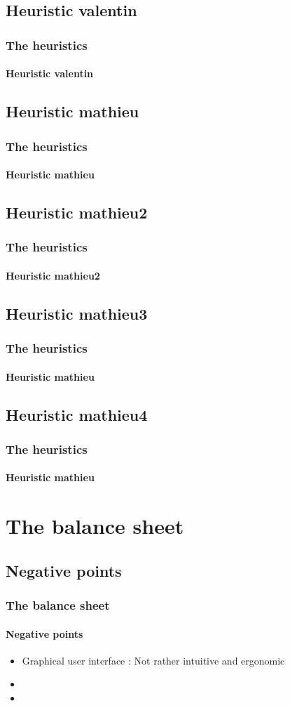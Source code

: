 \documentclass[a4paper, 11pt]{beamer}
\begin{document}
\subsection{Heuristic valentin}
\begin{frame}
 \frametitle{The heuristics}
 \framesubtitle{Heuristic valentin}
 
\end{frame}

\subsection{Heuristic mathieu}
\begin{frame}
 \frametitle{The heuristics}
 \framesubtitle{Heuristic mathieu}
 
\end{frame}

\subsection{Heuristic mathieu2}
\begin{frame}
 \frametitle{The heuristics}
 \framesubtitle{Heuristic mathieu2}
 
\end{frame}

\subsection{Heuristic mathieu3}
\begin{frame}
 \frametitle{The heuristics}
 \framesubtitle{Heuristic mathieu}
 
\end{frame}

\subsection{Heuristic mathieu4}
\begin{frame}
 \frametitle{The heuristics}
 \framesubtitle{Heuristic mathieu}
 
\end{frame}

\section{The balance sheet}
\subsection{Negative points}
\begin{frame}
 \frametitle{The balance sheet}
 \framesubtitle{Negative points}
 \begin{itemize}
  \item Graphical user interface : Not rather intuitive and ergonomic
  \item 
  \item 
 \end{itemize}
\end{frame}
\end{document}
